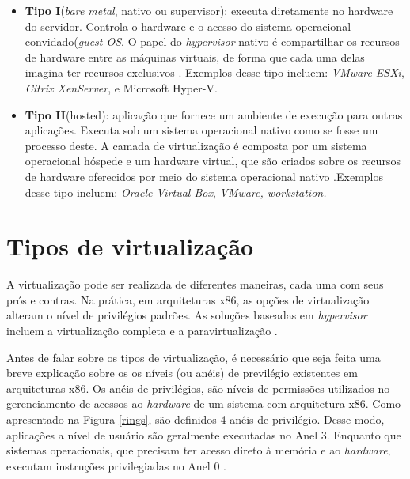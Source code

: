 \begin{itemize}
\item \textbf{Tipo I}(\textit{bare metal}, nativo ou supervisor): executa diretamente no hardware do servidor. Controla o hardware e o acesso do sistema operacional convidado(\textit{guest OS}. O papel do \textit{hypervisor} nativo é compartilhar os recursos de hardware entre as máquinas virtuais, de forma que cada uma delas imagina ter recursos exclusivos \cite{manoel}. Exemplos desse tipo incluem: \textit{VMware ESXi}, \textit{Citrix XenServer}, e {Microsoft Hyper-V.}

\item \textbf{Tipo II}(hosted): aplicação que fornece um ambiente de execução para outras aplicações. Executa sob um sistema operacional nativo como se fosse um processo deste. A camada de virtualização é composta por um sistema operacional hóspede e um hardware virtual, que são criados sobre os recursos de hardware oferecidos por meio do sistema operacional nativo \cite{manoel}.Exemplos desse tipo incluem: \textit{Oracle Virtual Box}, \textit{VMware, workstation.}
\end{itemize}

\section{Tipos de virtualização}
A virtualização pode ser realizada de diferentes maneiras, cada uma com seus prós e contras. Na prática, em arquiteturas x86, as opções de virtualização alteram o nível de privilégios padrões. As soluções baseadas em \textit{hypervisor} incluem a virtualização completa e a paravirtualização \cite{manoel}.

Antes de falar sobre os tipos de virtualização, é necessário que seja feita uma breve explicação sobre os os níveis (ou anéis) de previlégio existentes em arquiteturas x86. Os anéis de privilégios, são níveis de permissões utilizados no gerenciamento de acessos ao \textit{hardware} de um sistema com arquitetura x86. Como apresentado na Figura \ref{rings}, são definidos 4 anéis de privilégio. Desse modo, aplicações a nível de usuário são geralmente executadas no Anel 3. Enquanto que sistemas operacionais, que precisam ter acesso direto à memória e ao \textit{hardware}, executam instruções privilegiadas no Anel 0 \cite{vmware}. 

